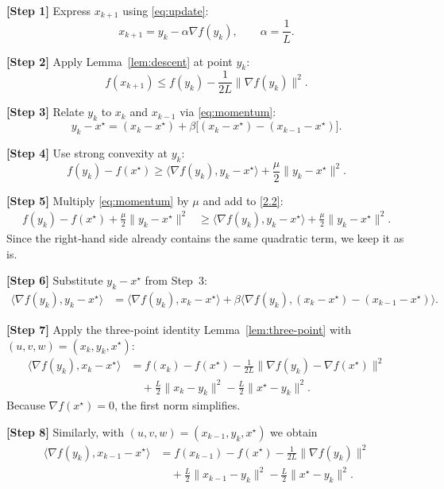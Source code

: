\documentclass[11pt]{article}
\begin{document}
\bigskip
\noindent\textbf{[Step 1]}  Express $x_{k+1}$ using \eqref{eq:update}:
\[
    x_{k+1}=y_k-\alpha\nabla f(y_k),\qquad \alpha=\frac{1}{L}.
\]

\noindent\textbf{[Step 2]}  Apply Lemma~\ref{lem:descent} at point $y_k$:
\[
    f(x_{k+1})\le f(y_k)-\frac{1}{2L}\|\nabla f(y_k)\|^2 . \tag{2.1}
\]

\noindent\textbf{[Step 3]}  Relate $y_k$ to $x_k$ and $x_{k-1}$ via \eqref{eq:momentum}:
\[
    y_k - x^\star = (x_k-x^\star)+\beta\bigl[(x_k-x^\star)-(x_{k-1}-x^\star)\bigr].
\]

\noindent\textbf{[Step 4]}  Use strong convexity at $y_k$:
\[
    f(y_k)-f(x^\star)\ge \langle\nabla f(y_k),y_k-x^\star\rangle+\frac{\mu}{2}\|y_k-x^\star\|^2 . \tag{2.2}
\]

\noindent\textbf{[Step 5]}  Multiply \eqref{eq:momentum} by $\mu$ and add to \eqref{2.2}:
\[
\begin{aligned}
    f(y_k)-f(x^\star)+\frac{\mu}{2}\|y_k-x^\star\|^2
    &\ge \langle\nabla f(y_k),y_k-x^\star\rangle
      +\frac{\mu}{2}\|y_k-x^\star\|^2 .
\end{aligned}
\]
Since the right‑hand side already contains the same quadratic term, we keep it as is.

\noindent\textbf{[Step 6]}  Substitute $y_k-x^\star$ from Step~3:
\[
\begin{aligned}
    \langle\nabla f(y_k),y_k-x^\star\rangle
    &=\langle\nabla f(y_k),x_k-x^\star\rangle
      +\beta\langle\nabla f(y_k), (x_k-x^\star)-(x_{k-1}-x^\star)\rangle .
\end{aligned}
\tag{2.3}
\]

\noindent\textbf{[Step 7]}  Apply the three‑point identity Lemma~\ref{lem:three-point} with
$(u,v,w)=(x_k, y_k, x^\star)$:
\[
\begin{aligned}
    \langle\nabla f(y_k),x_k-x^\star\rangle
    &= f(x_k)-f(x^\star)-\frac{1}{2L}\|\nabla f(y_k)-\nabla f(x^\star)\|^2 \\
    &\quad+\frac{L}{2}\|x_k-y_k\|^2-\frac{L}{2}\|x^\star-y_k\|^2 .
\end{aligned}
\tag{2.4}
\]
Because $\nabla f(x^\star)=0$, the first norm simplifies.

\noindent\textbf{[Step 8]}  Similarly, with $(u,v,w)=(x_{k-1}, y_k, x^\star)$ we obtain
\[
\begin{aligned}
    \langle\nabla f(y_k),x_{k-1}-x^\star\rangle
    &= f(x_{k-1})-f(x^\star)-\frac{1}{2L}\|\nabla f(y_k)\|^2 \\
    &\quad+\frac{L}{2}\|x_{k-1}-y_k\|^2-\frac{L}{2}\|x^\star-y_k\|^2 .
\end{aligned}
\tag{2.5}
\]
\end{document}
